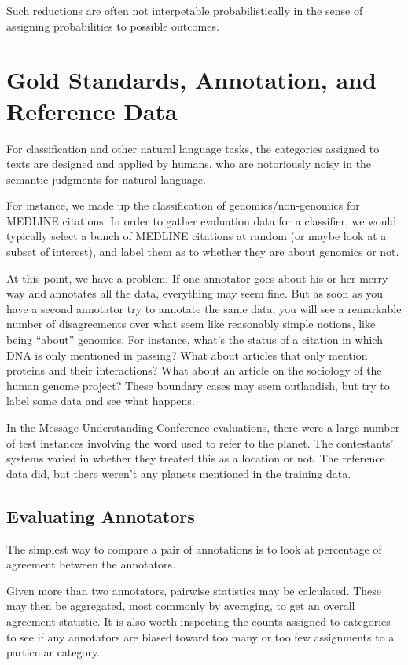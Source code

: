Such reductions are often not interpetable probabilistically in the
sense of assigning probabilities to possible outcomes.



\section{Gold Standards, Annotation, and Reference Data}

For classification and other natural language tasks, the categories
assigned to texts are designed and applied by humans, who are
notoriously noisy in the semantic judgments for natural language.  

For instance, we made up the classification of genomics/non-genomics
for MEDLINE citations.  In order to gather evaluation data for a
classifier, we would typically select a bunch of MEDLINE citations at
random (or maybe look at a subset of interest), and label them
as to whether they are about genomics or not.

At this point, we have a problem.  If one annotator goes about his or
her merry way and annotates all the data, everything may seem fine.
But as soon as you have a second annotator try to annotate the same
data, you will see a remarkable number of disagreements over what seem
like reasonably simple notions, like being ``about'' genomics.  For
instance, what's the status of a citation in which DNA is only
mentioned in passing?  What about articles that only mention proteins
and their interactions?  What about an article on the sociology of the
human genome project?  These boundary cases may seem outlandish, but
try to label some data and see what happens.

In the Message Understanding Conference evaluations, there were a
large number of test instances involving the word 
used to refer to the planet.  The contestants' systems varied in
whether they treated this as a location or not.  The reference data
did, but there weren't any planets mentioned in the training data.

\subsection{Evaluating Annotators}

The simplest way to compare a pair of annotations is to look at
percentage of agreement between the annotators.  

Given more than two annotators, pairwise statistics may be calculated.
These may then be aggregated, most commonly by averaging, to get an
overall agreement statistic.  It is also worth inspecting the counts
assigned to categories to see if any annotators are biased toward
too many or too few assignments to a particular category.

